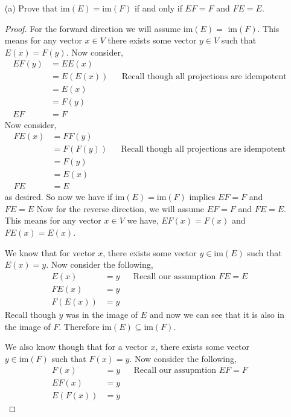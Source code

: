\documentclass[12pt]{article}
\begin{document}
\begin{itemize}
\begin{itemize}
    \vspace{.3cm}
    \item[(a)]
    Prove that $\text{im}(E) = \text{im}(F)$ if and only if $EF = F$ and $FE = E$.
    \begin{proof}
        For the forward direction we will assume im$(E) =$ im$(F)$. This means for any vector $x\in V$ there exists some vector $y\in V$ such that $E(x) = F(y)$. 
        Now consider,
        \begin{align*}
            EF(y) &= EE(x) \\ 
            &= E(E(x)) && \text{Recall though all projections are idempotent} \\
            &= E(x) \\ 
            &= F(y) \\
            EF &= F
        \end{align*}
        Now consider,
        \begin{align*}
            FE(x) &= FF(y) \\
            &= F(F(y)) && \text{Recall though all projections are idempotent} \\
            &= F(y) \\
            &= E(x) \\
            FE &= E
        \end{align*}
        as desired. So now we have if im$(E) = \text{im}(F)$ implies $EF = F$ and $FE = E$
        Now for the reverse direction, we will assume $EF = F$ and $FE = E$. This means for any vector $x\in V$ we have, $EF(x) = F(x)$ and $FE(x) = E(x)$. 

        We know that for vector $x$, there exists some vector $y\in \text{im}(E)$ such that $E(x) = y$. Now consider the following,
        \begin{align*}
            E(x) &= y && \text{Recall our assumption $FE = E$} \\
            FE(x) &= y \\
            F(E(x)) &= y 
        \end{align*}
        Recall though $y$ was in the image of $E$ and now we can see that it is also in the image of $F$. Therefore $\text{im}(E) \subseteq \text{im}(F)$.

        We also know though that for a vector $x$, there exists some vector $y \in \text{im}(F)$ such that $F(x) = y$. Now consider the following,
        \begin{align*}
            F(x) &= y && \text{Recall our assupmtion $EF = F$} \\
            EF(x) &= y \\
            E(F(x)) &= y
        \end{align*}


\end{proof}
\end{itemize}
\end{itemize}
\end{document}

